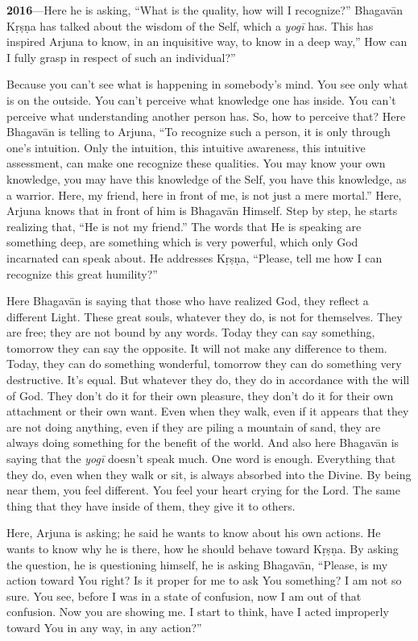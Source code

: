 \textbf{2016}---Here he is asking, “What is the quality, how will I recognize?” Bhagavān Kṛṣṇa has talked about the wisdom of the Self, which a \textit{yogī} has. This has inspired Arjuna to know, in an inquisitive way, to know in a deep way,” How can I fully grasp in respect of such an individual?”

Because you can’t see what is happening in somebody's mind. You see only what is on the outside. You can’t perceive what knowledge one has inside. You can’t perceive what understanding another person has. So, how to perceive that? Here Bhagavān is telling to Arjuna, “To recognize such a person, it is only through one’s intuition. Only the intuition, this intuitive awareness, this intuitive assessment, can make one recognize these qualities. You may know your own knowledge, you may have this knowledge of the Self, you have this knowledge, as a warrior. Here, my friend, here in front of me, is not just a mere mortal.” Here, Arjuna knows that in front of him is Bhagavān Himself. Step by step, he starts realizing that, “He is not my friend.” The words that He is speaking are something deep, are something which is very powerful, which only God incarnated can speak about. He addresses Kṛṣṇa, “Please, tell me how I can recognize this great humility?”

Here Bhagavān is saying that those who have realized God, they reflect a different Light. These great souls, whatever they do, is not for themselves. They are free; they are not bound by any words. Today they can say something, tomorrow they can say the opposite. It will not make any difference to them. Today, they can do something wonderful, tomorrow they can do something very destructive. It’s equal. But whatever they do, they do in accordance with the will of God. They don’t do it for their own pleasure, they don’t do it for their own attachment or their own want. Even when they walk, even if it appears that they are not doing anything, even if they are piling a mountain of sand, they are always doing something for the benefit of the world. And also here Bhagavān is saying that the \textit{yogī} doesn’t speak much. One word is enough. Everything that they do, even when they walk or sit, is always absorbed into the Divine. By being near them, you feel different. You feel your heart crying for the Lord. The same thing that they have inside of them, they give it to others.

Here, Arjuna is asking; he said he wants to know about his own actions. He wants to know why he is there, how he should behave toward Kṛṣṇa. By asking the question, he is questioning himself, he is asking Bhagavān, “Please, is my action toward You right? Is it proper for me to ask You something? I am not so sure. You see, before I was in a state of confusion, now I am out of that confusion. Now you are showing me. I start to think, have I acted improperly toward You in any way, in any action?”

